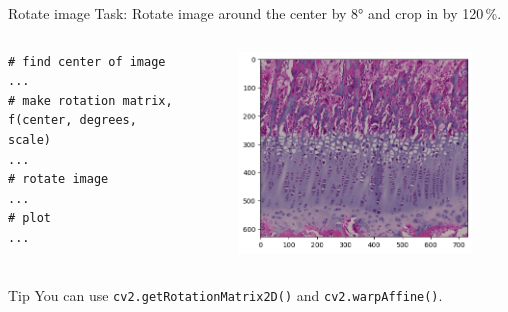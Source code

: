 \documentclass[compress%
,aspectratio=169%
]{beamer}
\begin{document}
\begin{frame}[fragile]{Rotate image}
\alert{Task:} Rotate image around the center by 8° and crop in by 120\,\%.
\vspace{-0.2cm}
\begin{columns}
    \begin{lstlisting}
# find center of image
...
# make rotation matrix, f(center, degrees, scale)
...
# rotate image
...
# plot
...
\end{lstlisting}
\begin{figure}
    \includegraphics[width = 1\linewidth,left]{img/pig_rotated.png}
\end{figure}
\end{columns}\vspace{-0cm}
\begin{alertblock}{Tip}
You can use \texttt{cv2.getRotationMatrix2D()} and \texttt{cv2.warpAffine()}.
\end{alertblock}
\end{frame}
\end{document}
